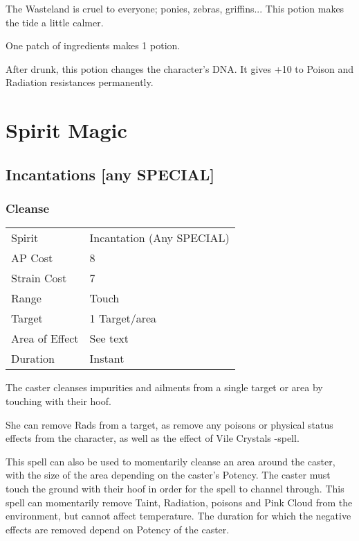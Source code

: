 \documentclass[11pt,a4paper,twocolumn]{book}
\begin{document}
\medskip

The Wasteland is cruel to everyone; ponies, zebras, griffins... This potion makes the tide a little calmer.

One patch of ingredients makes 1 potion.

After drunk, this potion changes the character's DNA. It gives +10 to Poison and Radiation resistances permanently.
\clearpage

\section*{Spirit Magic}

\subsection*{Incantations [any SPECIAL]}

\subsubsection*{Cleanse}
{
	\begin{tabu} to 75mm{| X[l,4] | X[l,7] |}
		\hline
		Spirit         & Incantation (Any SPECIAL) \\
		AP Cost        & 8                         \\
		Strain Cost    & 7                         \\
		Range          & Touch                     \\
		Target         & 1 Target/area             \\
		Area of Effect & See text                  \\
		Duration       & Instant                   \\ \hline
	\end{tabu}
	
}

\medskip

The caster cleanses impurities and ailments from a single target or area by touching with their hoof. 

She can remove Rads from a target, as remove any poisons or physical status effects from the character, as well as the effect of Vile Crystals -spell. 

This spell can also be used to momentarily cleanse an area around the caster, with the size of the area depending on the caster's Potency. The caster must touch the ground with their hoof in order for the spell to channel through. 
This spell can momentarily remove Taint, Radiation, poisons and Pink Cloud from the environment, but cannot affect temperature. The duration for which the negative effects are removed depend on Potency of the caster.
\end{document}
